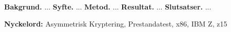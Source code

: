 \sammanfattning
\noindent
\textbf{Bakgrund.} ... \newline
\textbf{Syfte.} ... \newline
\textbf{Metod.} ... \newline
\textbf{Resultat.} ... \newline
\textbf{Slutsatser.} ...

\vspace{1cm}
\noindent
\textbf{Nyckelord:} Asymmetrisk Kryptering, Prestandatest, x86, IBM Z, z15

\cleardoublepage
